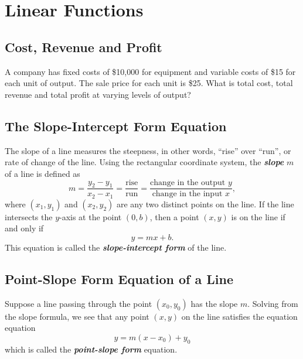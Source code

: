 \documentclass[en,11pt]{elegantbook}
\newcommand{\size}[2]{{\fontsize{#1}{0}\selectfont#2}}
\newenvironment{rmdthink}{
	\vspace*{0.5\baselineskip}
	\par\noindent
	\makebox[-4pt][r]{\color{green!90}\size{12}{\faLightbulbO}\,\,}
    \begin{tcolorbox}[
    enhanced,
    title={\textbf{\color{second}Think}},
    title style={left color=blue!10!green!20!white,right color=yellow!20!blue!20!white},
    colback=green!20!white,
    ]
    \sffamily
}{
    \end{tcolorbox}
	\par\ignorespacesafterend
}
\begin{document}
\hypertarget{linear-functions}{%
\chapter{Linear Functions}\label{linear-functions}}

\hypertarget{cost-revenue-and-profit}{%
\section{Cost, Revenue and Profit}\label{cost-revenue-and-profit}}

\begin{rmdthink}

A company has fixed costs of \$10,000 for equipment and variable costs of \$15 for each unit of output. The sale price for each unit is \$25. What is total cost, total revenue and total profit at varying levels of output?

\end{rmdthink}

\hypertarget{the-slope-intercept-form-equation}{%
\section{The Slope-Intercept Form Equation}\label{the-slope-intercept-form-equation}}

The slope of a line measures the steepness, in other words, ``rise'' over ``run'', or rate of change of the line. Using the rectangular coordinate system, the \textbf{\emph{slope}} \(m\) of a line is defined as
\[
m=\dfrac{y_2-y_1}{x_2-x_1}=\dfrac{\text{rise}}{\text{run}}=\dfrac{\text{change in the output }y}{\text{change in the input } x},
\]
where \((x_1, y_1)\) and \((x_2, y_2)\) are any two distinct points on the line. If the line intersects the \(y\)-axis at the point \((0, b)\), then a point \((x, y)\) is on the line if and only if
\[
y=mx+b.
\]
This equation is called the \textbf{\emph{slope-intercept form}} of the line.

\hypertarget{point-slope-form-equation-of-a-line}{%
\section{Point-Slope Form Equation of a Line}\label{point-slope-form-equation-of-a-line}}

Suppose a line passing through the point \((x_0, y_0)\) has the slope \(m\). Solving from the slope formula, we see that any point \((x, y)\) on the line satisfies the equation equation
\[
y=m(x-x_0)+y_0
\]
which is called the \textbf{\emph{point-slope form}} equation.
\end{document}
